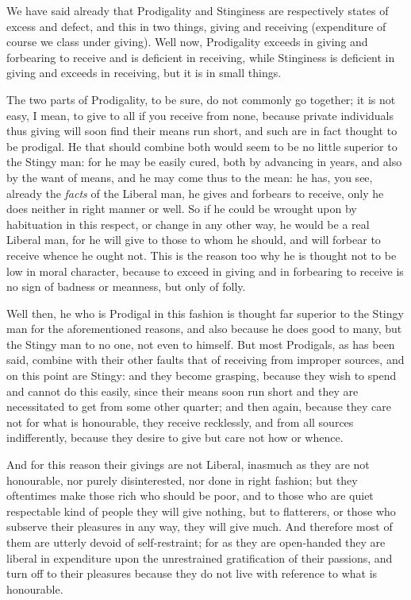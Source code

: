 We have said already that Prodigality and Stinginess are respectively states of
excess and defect, and this in two things, giving and receiving (expenditure of
course we class under giving). Well now, Prodigality exceeds in giving and
forbearing to receive and is deficient in receiving, while Stinginess is
deficient in giving and exceeds in receiving, but it is in small things.

The two parts of Prodigality, to be sure, do not commonly go together; it is
not easy, I mean, to give to all if you receive from none, because private
individuals thus giving will soon find their means run short, and such are in
fact thought to be prodigal. He that should combine both would seem to be no
little superior to the Stingy man: for he may be easily cured, both by
advancing in years, and also by the want of means, and he may come thus to the
mean: he has, you see, already the \emph{facts} of the Liberal man, he gives
and forbears to receive, only he does neither in right manner or well. So if he
could be wrought upon by habituation in this respect, or change in any other
way, he would be a real Liberal man, for he will give to those to whom he
should, and will forbear to receive whence he ought not. This is the reason too
why he is thought not to be low in moral character, because to exceed in giving
and in forbearing to receive is no sign of badness or meanness, but only of
folly.

Well then, he who is Prodigal in this fashion is thought far superior to the
Stingy man for the aforementioned reasons, and also because he does good to
many, but the Stingy man to no one, not even to himself. But most Prodigals, as
has been said, combine with their other faults that of receiving from improper
sources, and on this point are Stingy: and they become grasping, because they
wish to spend and cannot do this easily, since their means soon run short and
they are necessitated to get from some other quarter; and then again, because
they care not for what is honourable, they receive recklessly, and from all
sources indifferently, because they desire to give but care not how or whence.

And for this reason their givings are not Liberal, inasmuch as they are not
honourable, nor purely disinterested, nor done in right fashion; but they
oftentimes make those rich who should be poor, and to those who are quiet
respectable kind of people they will give nothing, but to flatterers, or those
who subserve their pleasures in any way, they will give much. And therefore
most of them are utterly devoid of self-restraint; for as they are open-handed
they are liberal in expenditure upon the unrestrained gratification of their
passions, and turn off to their pleasures because they do not live with
reference to what is honourable.

